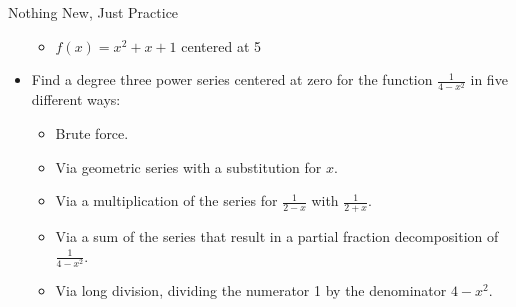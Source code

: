 \begin{exercise}{Nothing New, Just Practice \Coffeecup \Coffeecup}
\begin{itemize}
\begin{itemize}
\item $f(x)=x^2+x+1 $ centered at 5

\vspace*{1in}

\end{itemize}

\item  Find a degree three power series centered at zero for the function $\frac{1}{4-x^2}$ in five different ways:
 \begin{itemize}
\item Brute force.

\vspace*{2in}

\item Via geometric series with a substitution for $x$.  

\vspace*{2in}

\item Via a multiplication of the series for $\frac{1}{2-x}$ with 
$\frac{1}{2+x}$.

\vspace*{2in}

\item Via a sum of the series that result in a partial fraction decomposition of $\frac{1}{4-x^2}$.

\vspace*{2in}

\item Via long division, dividing the numerator 1 by the denominator $4-x^2$.

\vspace*{2in}

\end{itemize}
\end{itemize}
\end{exercise}
